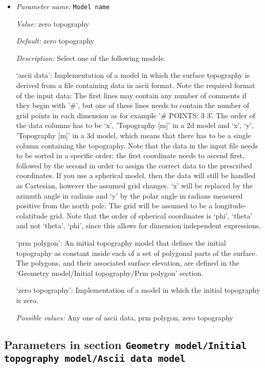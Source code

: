 \begin{itemize}
\item {\it Parameter name:} {\tt Model name}
\label{parameters:Geometry model/Initial topography model/Model name}


{\it Value:} zero topography


{\it Default:} zero topography


{\it Description:} Select one of the following models:

`ascii data': Implementation of a model in which the surface topography is derived from a file containing data in ascii format. Note the required format of the input data: The first lines may contain any number of comments if they begin with '\#', but one of these lines needs to contain the number of grid points in each dimension as for example '\# POINTS: 3 3'. The order of the data columns has to be `x', 'Topography [m]' in a 2d model and  `x', `y', 'Topography [m]' in a 3d model, which means that there has to be a single column containing the topography. Note that the data in the input file needs to be sorted in a specific order: the first coordinate needs to ascend first, followed by the second in order to assign the correct data to the prescribed coordinates. If you use a spherical model, then the data will still be handled as Cartesian, however the assumed grid changes. `x' will be replaced by the azimuth angle in radians  and `y' by the polar angle in radians measured positive from the north pole. The grid will be assumed to be a longitude-colatitude grid. Note that the order of spherical coordinates is `phi', `theta' and not `theta', `phi', since this allows for dimension independent expressions.

`prm polygon': An initial topography model that defines the initial topography as constant inside each of a set of polygonal parts of the surface. The polygons, and their associated surface elevation, are defined in the `Geometry model/Initial topography/Prm polygon' section.

`zero topography': Implementation of a model in which the initial topography is zero. 


{\it Possible values:} Any one of ascii data, prm polygon, zero topography
\end{itemize}



\subsection{Parameters in section \tt Geometry model/Initial topography model/Ascii data model}
\label{parameters:Geometry_20model/Initial_20topography_20model/Ascii_20data_20model}

